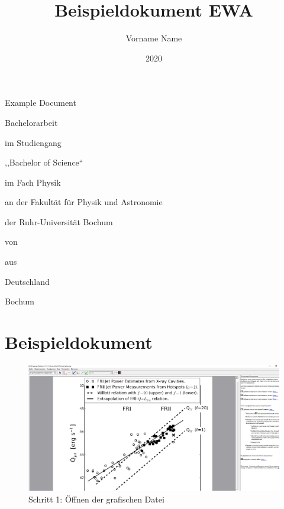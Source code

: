 \documentclass[11pt,
               a4paper,
               parskip=half, style=authoryear, citestyle=authoryear-comp
              bibliography=totoc,
               ]{scrartcl}
\title{Beispieldokument EWA} %
\author{Vorname Name} %
\date{2020} %
\newcommand{\theothertitle}{Example Document} %
\newcommand{\bachelormaster}{Bachelor} %
\newcommand{\sciencearts}{Science} %
\newcommand{\placeofbirth}{Deutschland} %
\newcommand{\location}{Bochum}
\begin{document}
\begin{titlepage}
  \centering
  {\huge\titlefont\thetitle\par
                  \bigskip\bigskip
                  \theothertitle\par}
  \vspace{2cm}

  \begin{spacing}{0.8}
    {\LARGE \bachelormaster arbeit\par
            \bigskip\medskip
            im Studiengang\par
            ,,\bachelormaster{} of \sciencearts``\par
            im Fach Physik\par
            \bigskip\medskip
            an der Fakultät für Physik und Astronomie\par
            der Ruhr-Universität Bochum\par}

    \vfill

    {\LARGE von\par
            \theauthor\par
            \bigskip\medskip
            aus\par
            \placeofbirth\par}
  \end{spacing}

  \vspace{1.8cm}

  {\LARGE \location{} \thedate\par}
\end{titlepage}
\restoregeometry
\cleardoublepage

\tableofcontents
\cleardoublepage

\section{Beispieldokument}


\begin{figure}
    \centering
    \includegraphics[scale=0.35]{shag1.jpg}
    \caption{Schritt 1: Öffnen der grafischen Datei}
    \label{fig:my_label}
\end{figure}
\end{document}
